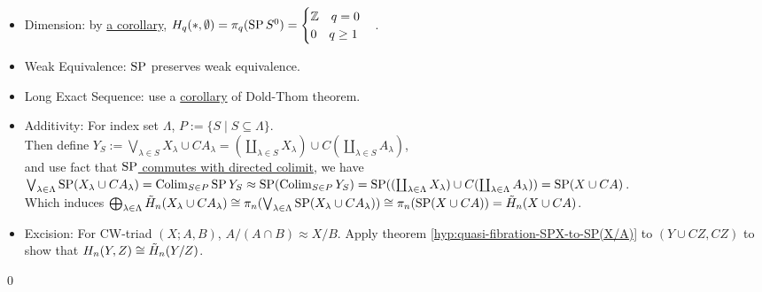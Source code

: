     \begin{prf}
        \text{ }\\
        \begin{itemize}
            \item Dimension: by \hyperref[hyp:SP-Sn-is-K(Z,n)]{a corollary}, $H_q(\ast, \emptyset) = \pi_q(\operatorname{SP} S^0) =
            \begin{cases}
                \mathbb Z \quad q = 0\\
                0  \quad q \geq 1
            \end{cases}$.
            \item Weak Equivalence: $\operatorname{SP}$ preserves weak equivalence.
            \item Long Exact Sequence: use a \hyperref[hyp:quasi-fibration-SP(XUAxI)-to-SP(XUCA)]{corollary}
                of Dold-Thom theorem.
            \item Additivity:
                For index set $\Lambda$, $P := \{S \mid S \subseteq \Lambda \}$.\\
                Then define $Y_S := \bigvee_{\lambda \in S} X_\lambda \cup CA_\lambda = (\coprod_{\lambda \in S} X_\lambda) \cup C (\coprod_{\lambda \in S} A_\lambda)$,\\
                and use fact that \hyperref[hyp:SP-commute-with-directed-colimit]{$\operatorname{SP}$ commutes with directed colimit}, we have\\
                $\bigvee_{\lambda \in \Lambda} \operatorname{SP} (X_\lambda \cup CA_\lambda) = \operatorname{Colim}_{S \in P} \operatorname{SP} Y_S \approx  \operatorname{SP} (\operatorname{Colim}_{S \in P} Y_S) = \operatorname{SP} ((\coprod_{\lambda \in \Lambda} X_\lambda) \cup C (\coprod_{\lambda \in \Lambda} A_\lambda)) = \operatorname{SP} ( X \cup CA)$.\\
                Which induces $\bigoplus_{\lambda \in \Lambda} \tilde{H}_n(X_\lambda \cup C A_\lambda) \cong \pi_n (\bigvee_{\lambda \in \Lambda} \operatorname{SP} (X_\lambda \cup CA_\lambda)) \cong \pi_n(\operatorname{SP} (X \cup CA)) = \tilde{H}_n(X \cup CA)$.
            \item Excision: For CW-triad $(X;A,B)$,
                $A/(A \cap B) \approx X/B$.
                Apply theorem \ref{hyp:quasi-fibration-SPX-to-SP(X/A)} to $(Y \cup CZ, CZ)$ to show that
                $H_n(Y,Z) \cong \tilde{H}_n(Y/Z)$.\\
        \end{itemize}
        \qed
    \end{prf}




